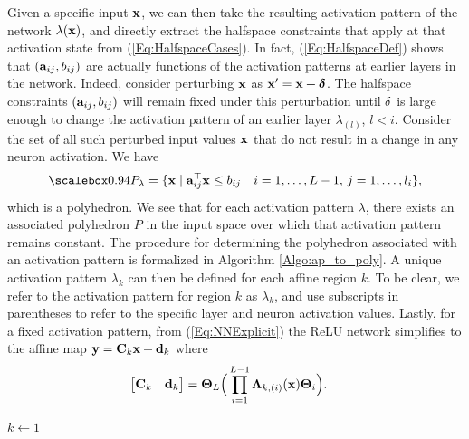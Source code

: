 Given a specific input $\mathbf{x}$, we can then take the resulting activation pattern of the network $\lambda(\mathbf{x})$, and directly extract the halfspace constraints that apply at that activation state from (\ref{Eq:HalfspaceCases}). In fact, (\ref{Eq:HalfspaceDef}) shows that $(\mathbf{a}_{ij}, b_{ij})$ are actually functions of the activation patterns at earlier layers in the network. Indeed, consider perturbing $\mathbf{x}$ as $\mathbf{x}' = \mathbf{x} + \boldsymbol{\delta}$. The halfspace constraints $(\mathbf{a}_{ij}, b_{ij})$ will remain fixed under this perturbation until $\mathbf{\delta}$ is large enough to change the activation pattern of an earlier layer $\lambda_{(l)}$, $l<i$. Consider the set of all such perturbed input values $\mathbf{x}$ that do not result in a change in any neuron activation. We have
\begin{align}
    \label{eq:hrep_2}
    \scalemath{0.94}{P_{\lambda} = \{\bx \mid \ba_{ij}^\top \bx \le b_{ij} \quad i = 1, \ldots, L-1, \, j = 1, \ldots, l_i\}}, 
\end{align}
which is a polyhedron. We see that for each activation pattern $\lambda$, there exists an associated polyhedron $P$ in the input space over which that activation pattern remains constant. The procedure for determining the polyhedron associated with an activation pattern is formalized in Algorithm \ref{Algo:ap_to_poly}. A unique activation pattern $\lambda_k$ can then be defined for each affine region $k$. To be clear, we refer to the activation pattern for region $k$ as $\lambda_k$, and use subscripts in parentheses to refer to the specific layer and neuron activation values. Lastly, for a fixed activation pattern, from (\ref{Eq:NNExplicit}) the ReLU network simplifies to the affine map $\mathbf{y} = \mathbf{C}_k \mathbf{x} + \mathbf{d}_k$ where
\begin{align}
\label{eq:CdDef}
    \begin{bmatrix}
        \mathbf{C}_k & \mathbf{d}_k
    \end{bmatrix} &= 
    \mathbf{\Theta}_L\Big(\prod_{i = 1}^{L-1}\mathbf{\Lambda}_{k,(i)}(\mathbf{x})\mathbf{\Theta}_i\Big).
\end{align}

\begin{algorithm}[h!]
\setlength{}
\SetAlgoLined
\DontPrintSemicolon
 \KwIn{$\lambda$}
 \KwOut{$\bA, \bb$}
 $k \leftarrow 1$ \\
\Return{$\bA, \bb$}
\caption{Polyhedron from Activation Pattern}
\label{Algo:ap_to_poly}
\end{algorithm}

